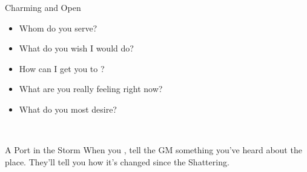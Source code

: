 \documentclass[8pt]{extarticle}
\begin{document}
\begin{minipage}[t]{4.6in}
\begin{basicmove}{Charming and Open}
  \begin{itemize}
  \item Whom do you serve?
  \item What do you wish I would do?
  \item How can I get you to \blank?
  \item What are you really feeling right now?
  \item What do you most desire?
  \end{itemize}

\end{basicmove}
\

\begin{basicmove}{A Port in the Storm}
    When you , tell the GM something you've heard about the
    place. They’ll tell you how it’s changed since the Shattering.
\end{basicmove}


\vfill\null
\end{minipage}

\charlower
\clearpage

\gearbanner
\end{document}

